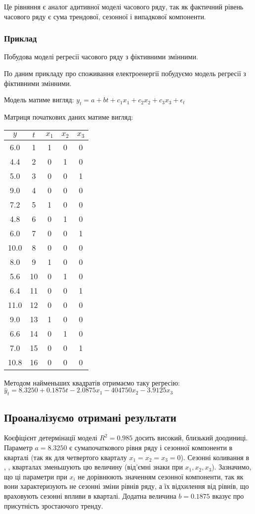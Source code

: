 \documentclass[a4paper, fontsize=10pt, oneside]{article}
\begin{document}
Це рівняння є аналог  адитивної моделі часового  ряду, так як фактичний рівень часового ряду є сума трендової, сезонної і випадкової компоненти.

\subsubsection*{Приклад} Побудова моделі регресії часового ряду з фіктивними змінними.

По даним прикладу про споживання електроенергії побудуємо модель регресії з фіктивними змінними.

Модель матиме вигляд: $y_{t} = a + bt + c_{1}x_{1} + c_{2}x_{2} + c_{3}x_{3} + \epsilon_{t}$

Матриця початкових даних матиме вигляд:


\begin{tabular}{|c|c|c|c|c|}
\hline
$y$ & $t$ & $x_{1}$ & $x_{2}$ & $x_{3}$\\
\hline
6.0 & 1 & 1 & 0 & 0\\
4.4 & 2 & 0 & 1 & 0\\
5.0 & 3 & 0 & 0 & 1\\
9.0 & 4 & 0 & 0 & 0\\
7.2 & 5 & 1 & 0 & 0\\
4.8 & 6 & 0 & 1 & 0\\
6.0 & 7 & 0 & 0 & 1\\
10.0 & 8 & 0 & 0 & 0\\
8.0 & 9 & 1 & 0 & 0\\
5.6 & 10 & 0 & 1 & 0\\
6.4 & 11 & 0 & 0 & 1\\
11.0 & 12 & 0 & 0 & 0\\
9.0 & 13 & 1 & 0 & 0\\
6.6 & 14 & 0 & 1 & 0\\
7.0 & 15 & 0 & 0 & 1\\
10.8 & 16 & 0 & 0 & 0\\
\hline
\end{tabular}


Методом найменьших квадратів отримаємо таку регресію: $\hat{y}_{t} = 8.3250 + 0.1875t - 2.0875x_{1} - 404750x_{2} - 3.9125x_{3}$

\subsection*{Проаналізуємо отримані результати}

Коєфіцієнт детермінації моделі $R^2 = 0.985$ досить високий, близький доодиниці. Параметр $a = 8.3250$ є сумапочаткового рівня ряду і  сезонної компоненти в \MakeUppercase{} кварталі (так як для четвертого кварталу $x_{1} = x_{2} = x_{3} = 0$). Сезонні коливання в \MakeUppercase{, , } кварталах зменьшують цю величину (від'ємні знаки при  $x_{1}, x_{2}, x_{3}$). Зазначимо, що ці параметри при $x_{i}$ не дорівнюють значенням сезонної компоненти, так як вони характеризують не сезонні зміни рівнів ряду, а їх відхилення від рівнів, що враховують сезонні впливи в \MakeUppercase{} кварталі. Додатна величина $b = 0.1875$ вказує про присутність зростаючого тренду.
\end{document}
